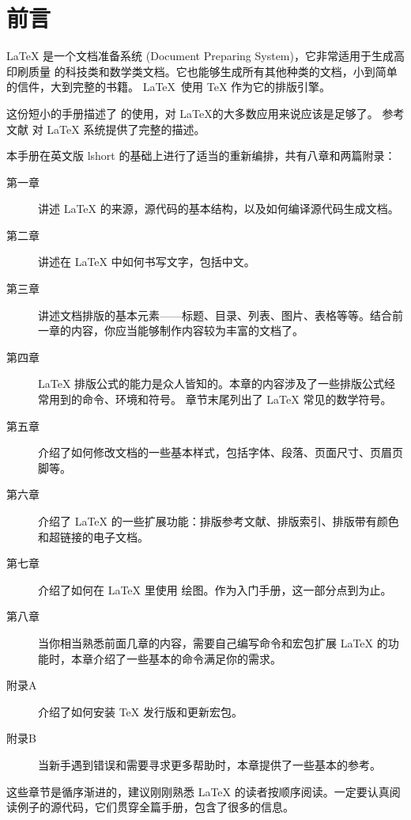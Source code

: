 \chapter{前言}

\LaTeX{} \cite{manual} 是一个文档准备系统 (Document Preparing System)，它非常适用于生成高印刷质量
的科技类和数学类文档。它也能够生成所有其他种类的文档，小到简单的信件，大到完整的书籍。
\LaTeX~使用 \TeX{} \cite{texbook} 作为它的排版引擎。

这份短小的手册描述了 \LaTeXe{} 的使用，对 \LaTeX 的大多数应用来说应该是足够了。
参考文献 \cite{manual,companion} 对 \LaTeX{} 系统提供了完整的描述。

\bigskip
本手册在英文版 lshort 的基础上进行了适当的重新编排，共有八章和两篇附录：
\begin{description}
  \item[第一章] 讲述 \LaTeX{} 的来源，源代码的基本结构，以及如何编译源代码生成文档。
  \item[第二章] 讲述在 \LaTeX{} 中如何书写文字，包括中文。
  \item[第三章] 讲述文档排版的基本元素——标题、目录、列表、图片、表格等等。结合前一章的内容，你应当能够制作内容较为丰富的文档了。
  \item[第四章] \LaTeX{} 排版公式的能力是众人皆知的。本章的内容涉及了一些排版公式经常用到的命令、环境和符号。
                章节末尾列出了 \LaTeX{} 常见的数学符号。
  \item[第五章] 介绍了如何修改文档的一些基本样式，包括字体、段落、页面尺寸、页眉页脚等。
  \item[第六章] 介绍了 \LaTeX{} 的一些扩展功能：排版参考文献、排版索引、排版带有颜色和超链接的电子文档。
  \item[第七章] 介绍了如何在 \LaTeX{} 里使用 \TikZ{} 绘图。作为入门手册，这一部分点到为止。
  \item[第八章] 当你相当熟悉前面几章的内容，需要自己编写命令和宏包扩展 \LaTeX{} 的功能时，本章介绍了一些基本的命令满足你的需求。
\end{description}
\begin{description}
  \item[附录A] 介绍了如何安装 \TeX{} 发行版和更新宏包。
  \item[附录B] 当新手遇到错误和需要寻求更多帮助时，本章提供了一些基本的参考。
\end{description}

\bigskip
这些章节是循序渐进的，建议刚刚熟悉 \LaTeX{} 的读者按顺序阅读。一定要认真阅读例子的源代码，它们贯穿全篇手册，包含了很多的信息。

